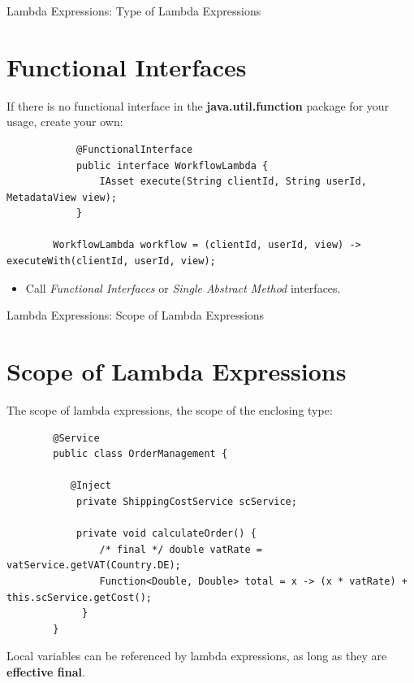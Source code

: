 \documentclass{beamer}
\begin{document}
	\begin{frame}[fragile]{Lambda Expressions: Type of Lambda Expressions}
		\section{Functional Interfaces}
		If there is no functional interface in the \textbf{java.util.function} package for your usage, create your own:
		\begin{lstlisting}
			@FunctionalInterface
			public interface WorkflowLambda {
			    IAsset execute(String clientId, String userId, MetadataView view);
			}

		WorkflowLambda workflow = (clientId, userId, view) -> executeWith(clientId, userId, view);
		\end{lstlisting}
		
		\begin{itemize}
			\item Call \textit{Functional Interfaces} or \textit{Single Abstract Method} interfaces.
		\end{itemize}
				
	\end{frame}	


	\begin{frame}[fragile]{Lambda Expressions: Scope of Lambda Expressions}
		\section{Scope of Lambda Expressions}
		
		The scope of lambda expressions, the scope of the enclosing type:
		\begin{lstlisting}
		@Service
		public class OrderManagement {

		   @Inject
  			private ShippingCostService scService;

  			private void calculateOrder() {
    			/* final */ double vatRate = vatService.getVAT(Country.DE);
    			Function<Double, Double> total = x -> (x * vatRate) + this.scService.getCost();
 			 }
		}
		\end{lstlisting}
		
		Local variables can be referenced by lambda expressions, as long as they are \textbf{effective final}.
	\end{frame}	
	
\end{document}
